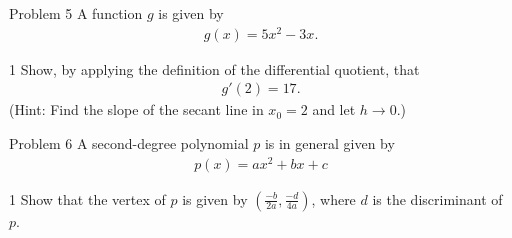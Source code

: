 \begin{opgavetekst}{Problem 5}
A function $g$ is given by
\begin{align*}
	g(x) = 5x^2 - 3x.
\end{align*}
\end{opgavetekst}
\begin{delopgave}{1}
	Show, by applying the definition of the differential quotient, that 
	\begin{align*}
		g'(2) = 17.
	\end{align*}
	(Hint: Find the slope of the secant line in $x_0 = 2$ and let $h \to 0$.)
\end{delopgave}	

\begin{opgavetekst}{Problem 6}
	A second-degree polynomial $p$ is in general given by
	\begin{align*}
		p(x) = ax^2 + bx + c
	\end{align*}
\end{opgavetekst}
\begin{delopgave}{1}
	Show that the vertex of $p$ is given by $\left(\frac{-b}{2a},\frac{-d}{4a} \right)$, where $d$ is the discriminant 
	of $p$. 
\end{delopgave}
